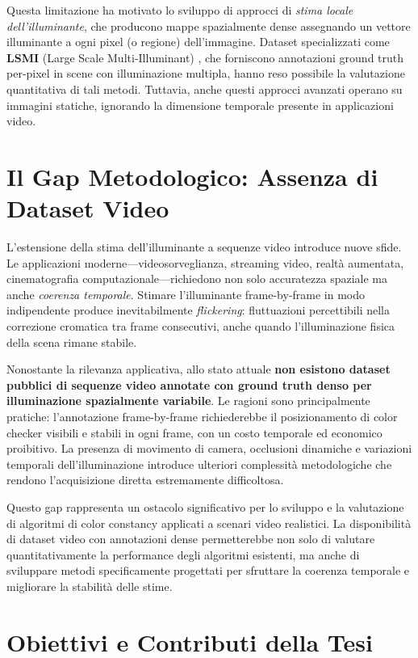 Questa limitazione ha motivato lo sviluppo di approcci di \emph{stima locale dell'illuminante}, che producono mappe spazialmente dense assegnando un vettore illuminante a ogni pixel (o regione) dell'immagine. Dataset specializzati come \textbf{LSMI} (Large Scale Multi-Illuminant) \cite{kim_large_2021}, che forniscono annotazioni ground truth per-pixel in scene con illuminazione multipla, hanno reso possibile la valutazione quantitativa di tali metodi. Tuttavia, anche questi approcci avanzati operano su immagini statiche, ignorando la dimensione temporale presente in applicazioni video.

\section{Il Gap Metodologico: Assenza di Dataset Video}

L'estensione della stima dell'illuminante a sequenze video introduce nuove sfide. Le applicazioni moderne---videosorveglianza, streaming video, realtà aumentata, cinematografia computazionale---richiedono non solo accuratezza spaziale ma anche \emph{coerenza temporale}. Stimare l'illuminante frame-by-frame in modo indipendente produce inevitabilmente \emph{flickering}: fluttuazioni percettibili nella correzione cromatica tra frame consecutivi, anche quando l'illuminazione fisica della scena rimane stabile.

Nonostante la rilevanza applicativa, allo stato attuale \textbf{non esistono dataset pubblici di sequenze video annotate con ground truth denso per illuminazione spazialmente variabile}. Le ragioni sono principalmente pratiche: l'annotazione frame-by-frame richiederebbe il posizionamento di color checker visibili e stabili in ogni frame, con un costo temporale ed economico proibitivo. La presenza di movimento di camera, occlusioni dinamiche e variazioni temporali dell'illuminazione introduce ulteriori complessità metodologiche che rendono l'acquisizione diretta estremamente difficoltosa.

Questo gap rappresenta un ostacolo significativo per lo sviluppo e la valutazione di algoritmi di color constancy applicati a scenari video realistici. La disponibilità di dataset video con annotazioni dense permetterebbe non solo di valutare quantitativamente la performance degli algoritmi esistenti, ma anche di sviluppare metodi specificamente progettati per sfruttare la coerenza temporale e migliorare la stabilità delle stime.

\section{Obiettivi e Contributi della Tesi}

